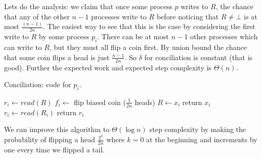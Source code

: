 \documentclass[twoside]{article}
\begin{document}
Lets do the analysis: we claim that once some process $p$ writes to $R$, the chance that any of the other $n-1$ processes write to $R$ before noticing that $R \neq \bot$ is at most $\frac{(n-1)}{2n}$. The easiest way to see that this is the case by considering the first write to $R$ by some process $p_i$. There can be at most $n-1$ other processes which can write to $R$, but they must all flip a coin first. By union bound the chance that some coin flips a head is just $\frac{n-1}{2n}$. So $\delta$ for conciliation is constant (that is good). Further the expected work and expected step complexity is $\Theta(n)$. 

\begin{algorithm}[ht]
	\caption{Conciliation: code for $p_i$.}
    \label{pseudocode:conciliation}
    \begin{algorithmic}[1]
    \State $r_i \leftarrow read(R)$
    	\State $f_i \leftarrow $ flip biased coin ($\frac{1}{2n}$ heads)
			\State $R \leftarrow x_i$	
			\State return $x_i$
		\Else
			\State $r_i \leftarrow read(R_i)$
    	\EndIf
    \EndWhile
    \State return $r_i$
	\end{algorithmic}
\end{algorithm}

We can improve this algorithm to $\Theta(\log n)$ step complexity by making the probability of flipping a head $\frac{2^k}{2n}$ where $k = 0$ at the beginning and increments by one every time we flipped a tail. 
\end{document}
